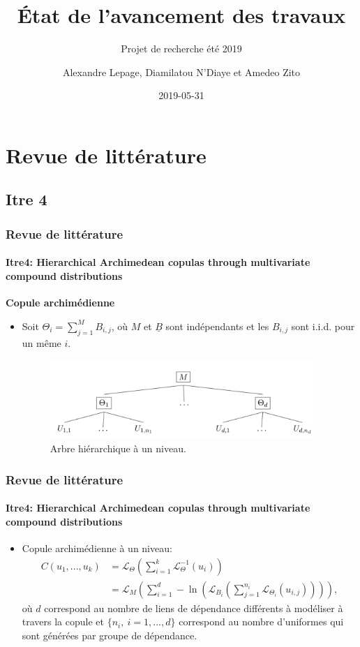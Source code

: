 \documentclass[11pt]{beamer}
\title[]{État de l'avancement des travaux}
\subtitle[]{Projet de recherche été 2019}
\author[Lepage A., N'Diaye D. et Zito A.]{Alexandre Lepage, Diamilatou N'Diaye \newline et Amedeo Zito}
\institute[ULaval] %
{
  École d'actuariat \\
  Université Laval, Québec, Canada \\
}
\date{2019-05-31} %
\begin{document}
\begin{frame}[label=titre, plain]
\titlepage
\end{frame}


\section{Revue de littérature}
\subsection{Itre 4}
\begin{frame}
	\frametitle{Revue de littérature}
	\framesubtitle{Itre4: Hierarchical Archimedean copulas through multivariate compound
		distributions \cite{Itre4}}
	
	\textbf{Copule archimédienne}
	
	\begin{itemize}
		\item Soit $\Theta_i = \sum_{j=1}^{M} B_{i,j}$, où $M$ et $\underline{B}$ sont indépendants et les $B_{i,j}$ sont i.i.d. pour un même $i$.
		\begin{figure}[H]
			\centering
			\includegraphics[height=3cm]{Hierarchie_1}
			\renewcommand{\figurename}{Illustration}
			\caption{Arbre hiérarchique à un niveau.}\label{hierarchie}
		\end{figure}
	
	\end{itemize}
\end{frame}


\begin{frame}
	\frametitle{Revue de littérature}
	\framesubtitle{Itre4: Hierarchical Archimedean copulas through multivariate compound
		distributions \cite{Itre4}}
	\begin{itemize}
		\item Copule archimédienne à un niveau:
		\begin{align}
			C(u_1, ... , u_k) 
			&= \mathcal{L}_{\Theta}\left(
				\sum_{i=1}^{k} \mathcal{L}_{\Theta}^{-1} (u_i) \right) \nonumber \\
			&= \mathcal{L}_{M}\left(
				\sum_{i=1}^{d} - \ln \left(
				 \mathcal{L}_{B_i}\left(
				  \sum_{j=1}^{n_i} \mathcal{L}_{\Theta_i} (u_{i,j})
				\right) \right)\right), \label{Copule_Archimedienne}
		\end{align}
		où $d$ correspond au nombre de liens de dépendance différents à modéliser à travers la copule et $\{n_i,\ i=1,...,d\}$ correspond au nombre d'uniformes qui sont générées par groupe de dépendance.
		
	\end{itemize}

\end{frame}
\end{document}
